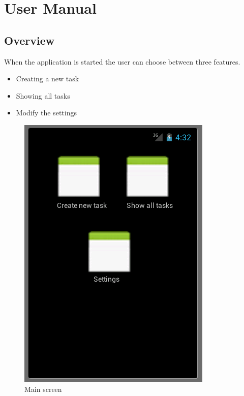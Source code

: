 \section{User Manual}

\subsection{Overview}
When the application is started the user can choose between three features.
\begin{itemize}
  \item Creating a new task
  \item Showing all tasks
  \item Modify the settings
\end{itemize}
 \begin{figure}[h]
  \caption{Main screen}
  \center
  	\includegraphics[scale=0.25]{../resources/main.png}
\end{figure}

